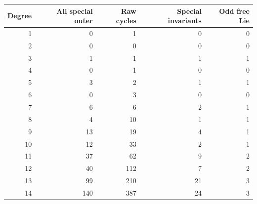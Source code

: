 \begin{center}\begin{tabular}{r|rrrr}
\toprule Degree&All special outer&Raw cycles&Special invariants&Odd free Lie\\\midrule
1 & 0 & 1 & 0 & 0\\
2 & 0 & 0 & 0 & 0\\
3 & 1 & 1 & 1 & 1\\
4 & 0 & 1 & 0 & 0\\
5 & 3 & 2 & 1 & 1\\
6 & 0 & 3 & 0 & 0\\
7 & 6 & 6 & 2 & 1\\
8 & 4 & 10 & 1 & 1\\
9 & 13 & 19 & 4 & 1\\
10 & 12 & 33 & 2 & 1\\
11 & 37 & 62 & 9 & 2\\
12 & 40 & 112 & 7 & 2\\
13 & 99 & 210 & 21 & 3\\
14 & 140 & 387 & 24 & 3\\
\bottomrule\end{tabular}\end{center}